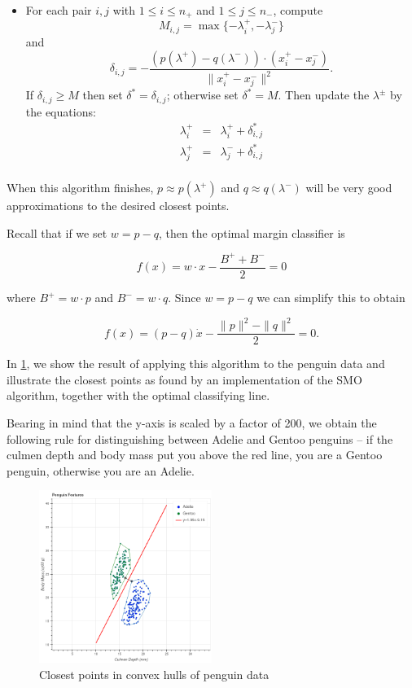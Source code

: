 \documentclass[
]{article}
\providecommand{\tightlist}{%
  \setlength{\itemsep}{0pt}\setlength{\parskip}{0pt}}
\begin{document}
\begin{itemize}
\tightlist
\item
  For each pair \(i,j\) with \(1\le i\le n_{+}\) and
  \(1\le j\le n_{-}\), compute \[
  M_{i,j} = \max\{-\lambda_{i}^{+},-\lambda_{j}^{-}\}
  \] and \[
  \delta_{i,j} = -\frac{(p(\lambda^{+})-q(\lambda^{-}))\cdot(x_{i}^{+}-x_{j}^{-})}{\|x^+_{i}-x^{-}_{j}\|^2}.
  \] If \(\delta_{i,j}\ge M\) then set \(\delta^{*}=\delta_{i,j}\);
  otherwise set \(\delta^{*}=M\). Then update the \(\lambda^{\pm}\) by
  the equations: \[
  \begin{aligned}
  \lambda^{+}_{i}&=&\lambda^{+}_{i}+\delta_{i,j}^{*} \\
  \lambda^{+}_{j}&=&\lambda^{-}_{j}+\delta_{i,j}^{*} \\
  \end{aligned}
  \]
\end{itemize}

When this algorithm finishes, \(p\approx p(\lambda^{+})\) and
\(q\approx q(\lambda^{-})\) will be very good approximations to the
desired closest points.

Recall that if we set \(w=p-q\), then the optimal margin classifier is

\[
f(x)=w\cdot x - \frac{B^{+}+B^{-}}{2}=0
\]

where \(B^{+}=w\cdot p\) and \(B^{-}=w\cdot q\). Since \(w=p-q\) we can
simplify this to obtain

\[
f(x)=(p-q)\dot x -\frac{\|p\|^2-\|q\|^2}{2}=0.
\]

In \cref{fig:penguinsolution}, we show the result of applying this
algorithm to the penguin data and illustrate the closest points as found
by an implementation of the SMO algorithm, together with the optimal
classifying line.

Bearing in mind that the y-axis is scaled by a factor of 200, we obtain
the following rule for distinguishing between Adelie and Gentoo penguins
-- if the culmen depth and body mass put you above the red line, you are
a Gentoo penguin, otherwise you are an Adelie.

\begin{figure}
\hypertarget{fig:penguinsolution}{%
\centering
\includegraphics[width=0.5\textwidth,height=\textheight]{../img/solution.png}
\caption{Closest points in convex hulls of penguin
data}\label{fig:penguinsolution}
}
\end{figure}
\end{document}
